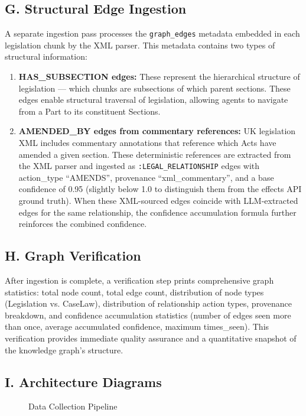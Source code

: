 \documentclass[10pt, a4paper, twocolumn]{article}
\begin{document}
\subsection{G. Structural Edge Ingestion}
A separate ingestion pass processes the \texttt{graph\_edges} metadata embedded in each legislation chunk by the XML parser. This metadata contains two types of structural information:

\begin{enumerate}
    \item \textbf{HAS\_SUBSECTION edges:} These represent the hierarchical structure of legislation — which chunks are subsections of which parent sections. These edges enable structural traversal of legislation, allowing agents to navigate from a Part to its constituent Sections.
    \item \textbf{AMENDED\_BY edges from commentary references:} UK legislation XML includes commentary annotations that reference which Acts have amended a given section. These deterministic references are extracted from the XML parser and ingested as \texttt{:LEGAL\_RELATIONSHIP} edges with action\_type ``AMENDS'', provenance ``xml\_commentary'', and a base confidence of 0.95 (slightly below 1.0 to distinguish them from the effects API ground truth). When these XML-sourced edges coincide with LLM-extracted edges for the same relationship, the confidence accumulation formula further reinforces the combined confidence.
\end{enumerate}

\subsection{H. Graph Verification}
After ingestion is complete, a verification step prints comprehensive graph statistics: total node count, total edge count, distribution of node types (Legislation vs. CaseLaw), distribution of relationship action types, provenance breakdown, and confidence accumulation statistics (number of edges seen more than once, average accumulated confidence, maximum times\_seen). This verification provides immediate quality assurance and a quantitative snapshot of the knowledge graph's structure.

\subsection{I. Architecture Diagrams}

\begin{figure}[t]
\centering
\vspace{6cm} %
\caption{Data Collection Pipeline}
\end{figure}
\end{document}

